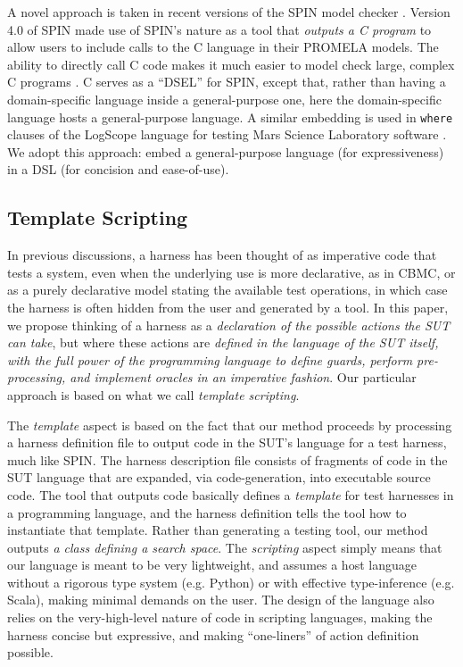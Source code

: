 \documentclass[runningheads,a4paper]{llncs}
\begin{document}
A novel approach is taken in recent versions of the SPIN model checker
\cite{SPIN}.  Version 4.0 of SPIN \cite{ModelDriven} made use of
SPIN's nature as a tool that \emph{outputs a C program} to allow users
to include calls to the C language in their PROMELA models.  The
ability to directly call C code makes it much easier to model check
large, complex C programs \cite{AMAI,ModelCode}.  C serves as a
``DSEL'' for SPIN, except that, rather than having a domain-specific
language inside a general-purpose one, here the domain-specific
language hosts a general-purpose language.  A similar embedding is
used in {\tt where} clauses of the LogScope language for testing Mars
Science Laboratory software \cite{scriptstospecs}.  We adopt this
approach: embed a general-purpose language (for expressiveness) in a
DSL (for concision and ease-of-use).


\subsection{Template Scripting}

In previous discussions, a harness has been thought of as imperative
code that tests a system, even when the underlying use is more
declarative, as in CBMC, or as a purely declarative model stating the
available test operations, in which case the harness is often hidden
from the user and generated by a tool.  In this paper, we propose
thinking of a harness as a \emph{declaration of the possible actions
the SUT can take}, but where these actions are \emph{defined in the
language of the SUT itself, with the full power of the programming
language to define guards, perform pre-processing, and implement
oracles in an imperative fashion}.  Our particular approach is based
on what we call \emph{template scripting}.

The \emph{template} aspect is based on the fact that our method
proceeds by processing a harness definition file to output code in the
SUT's language for a test harness, much like SPIN.  The harness
description file consists of fragments of code in the SUT language
that are expanded, via code-generation, into executable source code.
The tool that outputs code basically defines a \emph{template} for
test harnesses in a programming language, and the harness definition
tells the tool how to instantiate that template.  Rather
than generating a testing tool, our method outputs \emph{a class
defining a search space}.  The \emph{scripting} aspect simply means
that our language is meant to be very lightweight, and assumes a host
language without a rigorous type system (e.g. Python) or with
effective type-inference (e.g. Scala), making minimal demands on the
user.  The design of the language also relies on the very-high-level
nature of code in scripting languages, making the harness concise but
expressive, and making ``one-liners'' of action definition possible.
\end{document}
